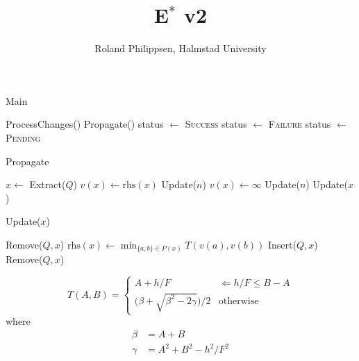 \documentclass[twocolumn]{article}
\newcommand{\rhs}{\text{rhs}}
\begin{document}
\title{E$^\ast$ v2}
\author{Roland Philippsen, Halmstad University}
\maketitle

\begin{algorithm}
  \caption{Main}\label{algo:main}
  \begin{algorithmic}
    \LOOP
      \STATE ProcessChanges()
      \STATE Propagate()
        \STATE status $\leftarrow$ \textsc{Success}
        \STATE status $\leftarrow$ \textsc{Failure}
      \ELSE
        \STATE status $\leftarrow$ \textsc{Pending}
      \ENDIF
    \ENDLOOP
  \end{algorithmic}
\end{algorithm}

\begin{algorithm}
  \caption{Propagate}\label{algo:propagate}
  \begin{algorithmic}
      \STATE $x \leftarrow$ Extract($Q$)
      \IF { $v(x) > \rhs(x)$ }
        \STATE $v(x) \leftarrow \rhs(x)$
          \STATE Update($n$)
        \ENDFOR
      \ELSE
        \STATE $v(x) \leftarrow \infty$
          \STATE Update($n$)
        \ENDFOR
        \STATE Update($x$)
      \ENDIF
    \ENDIF
  \end{algorithmic}
\end{algorithm}

\begin{algorithm}
  \caption{Update($x$)}\label{algo:update}
  \begin{algorithmic}
      \STATE Remove($Q, x$)
    \ELSE
      \STATE $\rhs(x) \leftarrow \min_{\{a,b\} \in P(x)} T(v(a),v(b))$
      \IF { $v(x) \ne \rhs(x)$ }
        \STATE Insert($Q, x$)
      \ELSE
        \STATE Remove($Q, x$)
      \ENDIF
    \ENDIF
  \end{algorithmic}
\end{algorithm}

\begin{equation}
  T(A,B) =
  \begin{cases}
    A + h/F                                & \Leftarrow h/F \leq B-A \\
    \big(\beta + \sqrt{\beta^2 - 2\gamma}\big) / 2 & \text{otherwise}
  \end{cases}
\end{equation}
\noindent where
\begin{subequations}
  \begin{align}
    \beta &= A + B \\
    \gamma &= A^2 + B^2 - h^2/F^2
  \end{align}
\end{subequations}
\end{document}
